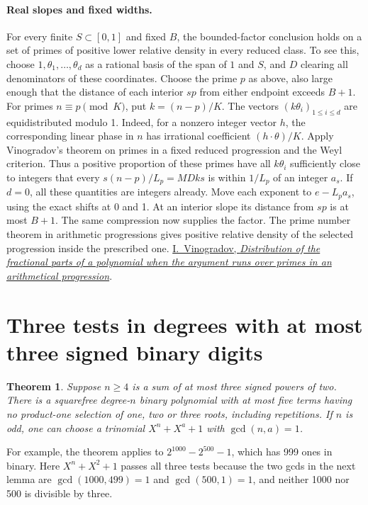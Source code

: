 \documentclass[11pt]{article}
\newtheorem{theorem}{Theorem}
\begin{document}
\paragraph{Real slopes and fixed widths.}
For every finite \(S\subset[0,1]\) and fixed \(B\), the bounded-factor
conclusion holds on a set of primes of positive lower relative density
in every reduced class. To see this, choose
\(1,\theta_1,\ldots,\theta_d\) as a rational basis of the span of
\(1\) and \(S\), and \(D\) clearing all denominators of these coordinates.
Choose the prime \(p\) as above, also large enough that the distance of
each interior \(sp\) from either endpoint exceeds \(B+1\).
For primes \(n\equiv p\pmod K\), put \(k=(n-p)/K\).
The vectors \((k\theta_i)_{1\le i\le d}\) are equidistributed modulo 1.
Indeed, for a nonzero integer vector \(h\), the corresponding
linear phase in \(n\) has irrational coefficient
\((h\cdot\theta)/K\). Apply Vinogradov's theorem on primes in a
fixed reduced progression and the Weyl criterion. Thus a positive
proportion of these primes have all \(k\theta_i\) sufficiently close
to integers that every \(s(n-p)/L_p=MDks\) is within \(1/L_p\)
of an integer \(a_s\). If \(d=0\), all these quantities are integers
already. Move each exponent to \(e-L_p a_s\), using the exact
shifts at 0 and 1. At an interior slope its distance from \(sp\) is
at most \(B+1\). The same compression now supplies the factor. The
prime number theorem in arithmetic progressions gives positive
relative density of the selected progression inside the prescribed one.
\href{https://www.mathnet.ru/eng/im3453}{I.~Vinogradov,
\emph{Distribution of the fractional parts of a polynomial when the
argument runs over primes in an arithmetical progression}}.

\section{Three tests in degrees with at most three signed binary digits}
\begin{theorem}\label{thm:signed-digits}
Suppose \(n\ge4\) is a sum of at most three signed powers of two.
There is a squarefree degree-\(n\) binary polynomial with at most
five terms having no product-one selection of one, two or three roots,
including repetitions. If \(n\) is odd, one can choose a trinomial
\(X^n+X^a+1\) with \(\gcd(n,a)=1\).
\end{theorem}
For example, the theorem applies to \(2^{1000}-2^{500}-1\), which has
999 ones in binary. Here \(X^n+X^2+1\) passes all three tests because
the two gcds in the next lemma are \(\gcd(1000,499)=1\) and
\(\gcd(500,1)=1\), and neither 1000 nor 500 is divisible by three.
\end{document}
